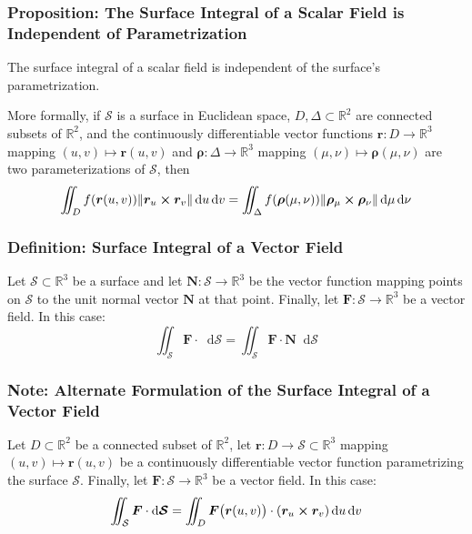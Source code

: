 \documentclass[11pt, a4paper]{article}
\newcommand{\diff}{\mathop{}\!\mathrm{d}} %
\begin{document}
\subsubsection{Proposition: The Surface Integral of a Scalar Field is Independent of Parametrization}
The surface integral of a scalar field is independent of the surface's parametrization.

More formally, if $ \mathcal{S} $ is a surface in Euclidean space, $ D, \Delta \subset \mathbb{R}^2 $ are connected subsets of $ \mathbb{R}^2 $, and the continuously differentiable vector functions $ \bm{r} : D \rightarrow \mathbb{R}^3 $ mapping $ (u, v) \mapsto \bm{r}(u, v) $ and $ \bm{\rho} : \Delta \rightarrow \mathbb{R}^3 $ mapping $ (\mu, \nu) \mapsto \bm{\rho}(\mu, \nu) $ are two parameterizations of $ \mathcal{S} $, then
\begin{equation*}
		\iint_{D} f(\bm{r}(u, v)) \norm{\bm{r}_u \cross \bm{r}_v} \diff u \diff v = \iint_\Delta f(\bm{\rho}(\mu, \nu)) \norm{\bm{\rho}_\mu \cross \bm{\rho}_\nu} \diff \mu \diff \nu
\end{equation*}

\subsubsection{Definition: Surface Integral of a Vector Field}
Let $ \mathcal{S} \subset \mathbb{R}^3 $ be a surface and let $ \bm{N} : \mathcal{S} \to \mathbb{R}^3 $ be the vector function mapping points on $ \mathcal{S} $ to the unit normal vector $\mathbf{N}$ at that point. Finally, let $ \bm{F} : \mathcal{S} \rightarrow \mathbb{R}^3 $ be a vector field. In this case:
\begin{equation*}
	\iint_{\mathcal{S}} \bm{F} \cdot \diff \bm{\mathcal{S}} = \iint_{\mathcal{S}} \bm{F} \cdot \bm{N} \diff \mathcal{S}
\end{equation*} 

\subsubsection{Note: Alternate Formulation of the Surface Integral of a Vector Field}
Let $ D \subset \mathbb{R}^2 $ be a connected subset of $ \mathbb{R}^2 $, let $ \bm{r} : D \rightarrow \mathcal{S} \subset \mathbb{R}^3 $ mapping $ (u, v) \mapsto \bm{r}(u, v) $ be a continuously differentiable vector function parametrizing the surface $ \mathcal{S} $. Finally, let $ \bm{F} : \mathcal{S} \rightarrow \mathbb{R}^3 $ be a vector field. In this case:
\begin{equation*}
	\iint_{\mathcal{S}} \bm{F} \cdot \diff \bm{\mathcal{S}} = \iint_D \bm{F}\big(\bm{r}(u, v) \big) \cdot (\bm{r}_u \cross \bm{r}_v) \diff u \diff v
\end{equation*}
\end{document}
